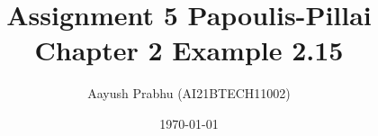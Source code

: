\documentclass{beamer}
\DeclareMathOperator*{\Res}{Res}
\begin{document}
\newcommand{\BEQA}{\begin{eqnarray}}
\newcommand{\EEQA}{\end{eqnarray}}
\newcommand{\define}{\stackrel{\triangle}{=}}
\newcommand*\circled[1]{\tikz[baseline= (char.base)]{
    \node[shape=circle,draw,inner sep=2pt] (char) {#1};}}

\providecommand{\mbf}{\mathbf}
\providecommand{\pr}[1]{\ensuremath{\Pr\left(#1\right)}}
\providecommand{\qfunc}[1]{\ensuremath{Q\left(#1\right)}}
\providecommand{\sbrak}[1]{\ensuremath{{}\left[#1\right]}}
\providecommand{\lsbrak}[1]{\ensuremath{{}\left[#1\right.]}}
\providecommand{\rsbrak}[1]{\ensuremath{{}\left[#1\right.]}}
\providecommand{\brak}[1]{\ensuremath{\left(#1\right)}}
\providecommand{\lbrak}[1]{\ensuremath{\left(#1\right.)}
\providecommand{\rbrak}[1]{\ensuremath{\left[#1\right.]}}}
\providecommand{\cbrak}[1]{\ensuremath{\left\{#1\right\}}}
\providecommand{\lcbrak}[1]{\ensuremath{\left\{#1\right.}}
\providecommand{\rcbrak}[1]{\ensuremath{\left.#1\right\}}}
\theoremstyle{remark}
\newtheorem{rem}{Remark}
\newcommand{\sgn}{\mathop{\mathrm{sgn}}}
\providecommand{\abs}[1]{\left\vert#1\right\vert}
\providecommand{\res}[1]{\Res\displaylimits_{#1}} 
\providecommand{\norm}[1]{\left\lVert#1\right\rVert}
\providecommand{\mtx}[1]{\mathbf{#1}}
\providecommand{\mean}[1]{E\left[ #1 \right]}
\providecommand{\fourier}{\overset{\mathcal{F}}{ \rightleftharpoons}}
\providecommand{\system}{\overset{\mathcal{H}}{ \longleftrightarrow}}
\newcommand{\cosec}{\,\text{cosec}\,}
\newcommand*{\permcomb}[4][0mu]{{{}^{#3}\mkern#1#2_{#4}}}
\newcommand*{\perm}[1][-3mu]{\permcomb[#1]{P}}
\newcommand*{\comb}[1][-1mu]{\permcomb[#1]{C}}
\renewcommand{\thetable}{\arabic{table}} 
\providecommand{\dec}[2]{\ensuremath{\overset{#1}{\underset{#2}{\gtrless}}}}
\newcommand{\myvec}[1]{\ensuremath{\begin{pmatrix}#1\end{pmatrix}}}
\newcommand{\mydet}[1]{\ensuremath{\begin{vmatrix}#1\end{vmatrix}}}
\makeatletter
{}
\makeatother
\let\StandardTheFigure\thefigure{}
\let\vec\mathbf{}
\title{Assignment 5 Papoulis-Pillai Chapter 2 Example 2.15 }
\author{Aayush Prabhu (AI21BTECH11002)}
\date{\today}
\logo{\large \LaTeX}
\end{document}
